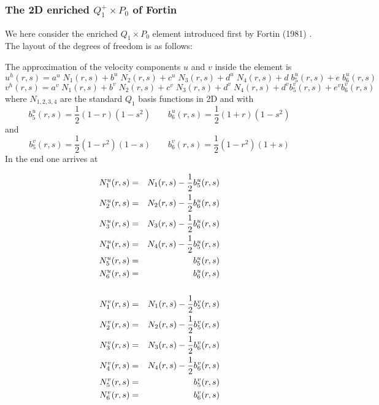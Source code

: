 \newpage
\subsubsection{The 2D enriched $Q_1^+\times P_0$ of Fortin} \label{ss:Q1pP02D}

We here consider the enriched $Q_1\times P_0$ element introduced first by 
Fortin (1981) \cite{fort81}.
The layout of the degrees of freedom is as follows:



\noindent The approximation of the velocity components $u$ and $v$ inside the element is
\[
u^h(r,s) = a^u \; N_1(r,s) + b^u \;  N_2(r,s) + c^u \; N_3(r,s) +d^u \; N_4(r,s) 
+ d\; b_5^u(r,s) + e\; b_{6}^u(r,s)
\]
\[
v^h(r,s) = a^v \; N_1(r,s) + b^v \;  N_2(r,s) + c^v \; N_3(r,s) +d^v \; N_4(r,s) 
+ d^v b_5^v(r,s) + e^v b_{6}^v(r,s)
\]
where $N_{1,2,3,4}$ are the standard $Q_1$ basis functions in 2D and with 
\[
b_5^u(r,s) = \frac{1}{2}(1-r)(1-s^2)
\qquad
b_6^u(r,s) = \frac{1}{2}(1+r)(1-s^2)
\]
and
\[
b_5^v(r,s) = \frac{1}{2}(1-r^2)(1-s)
\qquad
b_6^v(r,s) = \frac{1}{2}(1-r^2)(1+s)
\]
In the end one arrives at

\begin{mdframed}[backgroundcolor=blue!5]
\begin{eqnarray}
{N}_1^u(r,s) &=&  N_1(r,s) - \frac{1}{2} b_5^u(r,s)\nonumber\\
{N}_2^u(r,s) &=&  N_2(r,s) - \frac{1}{2} b_6^u(r,s)\nonumber\\
{N}_3^u(r,s) &=&  N_3(r,s) - \frac{1}{2} b_6^u(r,s)\nonumber\\
{N}_4^u(r,s) &=&  N_4(r,s) - \frac{1}{2} b_5^u(r,s)\nonumber\\
{N}_5^u(r,s) &=&  b_5^u(r,s) \nonumber\\
{N}_6^u(r,s) &=&  b_6^u(r,s) \nonumber\\
\nonumber\\
{N}_1^v(r,s) &=&  N_1(r,s) - \frac{1}{2} b_5^v(r,s)\nonumber\\
{N}_2^v(r,s) &=&  N_2(r,s) - \frac{1}{2} b_5^v(r,s)\nonumber\\
{N}_3^v(r,s) &=&  N_3(r,s) - \frac{1}{2} b_6^v(r,s)\nonumber\\
{N}_4^v(r,s) &=&  N_4(r,s) - \frac{1}{2} b_6^v(r,s)\nonumber\\
{N}_5^v(r,s) &=&  b_5^v(r,s) \nonumber\\
{N}_6^v(r,s) &=&  b_6^v(r,s) 
\end{eqnarray}
\end{mdframed}

